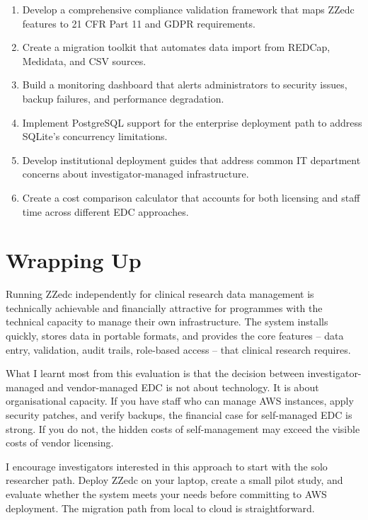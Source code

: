 \documentclass[
  letterpaper,
  DIV=11,
  numbers=noendperiod]{scrartcl}
\providecommand{\tightlist}{%
  \setlength{\itemsep}{0pt}\setlength{\parskip}{0pt}}
\begin{document}
\begin{enumerate}
\def\labelenumi{\arabic{enumi}.}
\tightlist
\item
  Develop a comprehensive compliance validation framework that maps
  ZZedc features to 21 CFR Part 11 and GDPR requirements.
\item
  Create a migration toolkit that automates data import from REDCap,
  Medidata, and CSV sources.
\item
  Build a monitoring dashboard that alerts administrators to security
  issues, backup failures, and performance degradation.
\item
  Implement PostgreSQL support for the enterprise deployment path to
  address SQLite's concurrency limitations.
\item
  Develop institutional deployment guides that address common IT
  department concerns about investigator-managed infrastructure.
\item
  Create a cost comparison calculator that accounts for both licensing
  and staff time across different EDC approaches.
\end{enumerate}

\section{Wrapping Up}\label{wrapping-up}

Running ZZedc independently for clinical research data management is
technically achievable and financially attractive for programmes with
the technical capacity to manage their own infrastructure. The system
installs quickly, stores data in portable formats, and provides the core
features -- data entry, validation, audit trails, role-based access --
that clinical research requires.

What I learnt most from this evaluation is that the decision between
investigator-managed and vendor-managed EDC is not about technology. It
is about organisational capacity. If you have staff who can manage AWS
instances, apply security patches, and verify backups, the financial
case for self-managed EDC is strong. If you do not, the hidden costs of
self-management may exceed the visible costs of vendor licensing.

I encourage investigators interested in this approach to start with the
solo researcher path. Deploy ZZedc on your laptop, create a small pilot
study, and evaluate whether the system meets your needs before
committing to AWS deployment. The migration path from local to cloud is
straightforward.
\end{document}

